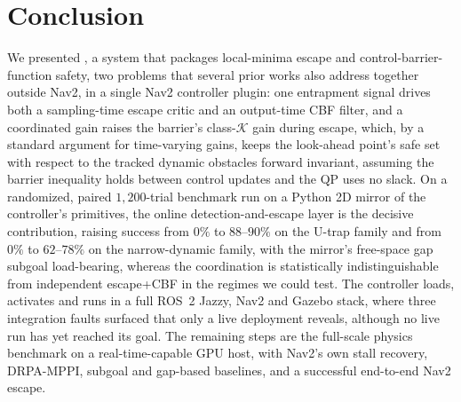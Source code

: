 \section{Conclusion}\label{sec:conclusion}

We presented \sname, a system that packages local-minima escape and control-barrier-function safety, two problems that several prior works also address together outside Nav2, in a single Nav2 controller plugin: one entrapment signal drives both a sampling-time escape critic and an output-time CBF filter, and a coordinated gain raises the barrier's class-$\mathcal{K}$ gain during escape, which, by a standard argument for time-varying gains, keeps the look-ahead point's safe set with respect to the tracked dynamic obstacles forward invariant, assuming the barrier inequality holds between control updates and the QP uses no slack. On a randomized, paired $1{,}200$-trial benchmark run on a Python 2D mirror of the controller's primitives, the online detection-and-escape layer is the decisive contribution, raising success from $0\%$ to $88$--$90\%$ on the U-trap family and from $0\%$ to $62$--$78\%$ on the narrow-dynamic family, with the mirror's free-space gap subgoal load-bearing, whereas the coordination is statistically indistinguishable from independent escape+CBF in the regimes we could test. The controller loads, activates and runs in a full ROS~2 Jazzy, Nav2 and Gazebo stack, where three integration faults surfaced that only a live deployment reveals, although no live run has yet reached its goal. The remaining steps are the full-scale physics benchmark on a real-time-capable GPU host, with Nav2's own stall recovery, DRPA-MPPI, subgoal and gap-based baselines, and a successful end-to-end Nav2 escape.
